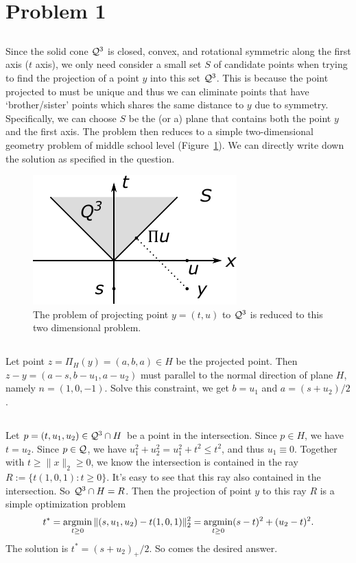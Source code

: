 \section{Problem 1}

\subsection{} %

Since the solid cone $\mathcal{Q}^3$ is closed, convex,
and rotational symmetric along the first axis ($t$ axis),
we only need consider a small set $S$ of candidate points
when trying to find the projection of a point $y$ into this set $\mathcal{Q}^3$.
This is because the point projected to must be unique
and thus we can eliminate points that have `brother/sister' points which
shares the same distance to $y$ due to symmetry.
Specifically, we can choose $S$ be the (or a) plane that contains
both the point $y$ and the first axis.
The problem then reduces to a simple two-dimensional geometry problem
of middle school level (Figure~\ref{fig:1}).
We can directly write down the solution as specified in the question.

\begin{figure}[ht]
\centering
    \includegraphics[width=0.36\linewidth]{figure/fig1}
    \caption{\small
    The problem of projecting point $y=(t,u)$ to $\mathcal{Q}^3$ is
    reduced to this two dimensional problem.}
    \label{fig:1}
\end{figure}

\subsection{} %

Let point $z=\Pi_H(y)=(a,b,a)\in H$ be the projected point.
Then $z-y=(a-s, b-u_1, a-u_2)$ must parallel to the normal direction of plane $H$,
namely $n=(1,0,-1)$.
Solve this constraint,
we get $b=u_1$ and $a=(s+u_2)/2$.

\subsection{} %

Let $p=(t,u_1,u_2)\in \mathcal{Q}^3\cap H$ be a point in the intersection.
Since $p\in H$, we have $t=u_2$.
Since $p \in \mathcal{Q}$, we have $u_1^2+u_2^2=u_1^2 + t^2\le t^2$,
and thus $u_1\equiv0$.
Together with $t\ge\|x\|_2\ge0$,
we know the intersection is contained in the ray $R:=\{t(1,0,1): t\ge0\}$.
It's easy to see that this ray also contained in the intersection.
So $\mathcal{Q}^3\cap H=R$.
Then the projection of point $y$ to this ray $R$ is a simple optimization problem
\begin{equation}
    t^*=\mathop{\mathrm{argmin}}_{t\ge0}\|(s,u_1,u_2)-t(1,0,1)\|_2^2=\mathop{\mathrm{argmin}}_{t\ge0}(s-t)^2+(u_2-t)^2.
\end{equation}
The solution is $t^*=(s+u_2)_+/2$.
So comes the desired answer.

\subsection{} %
